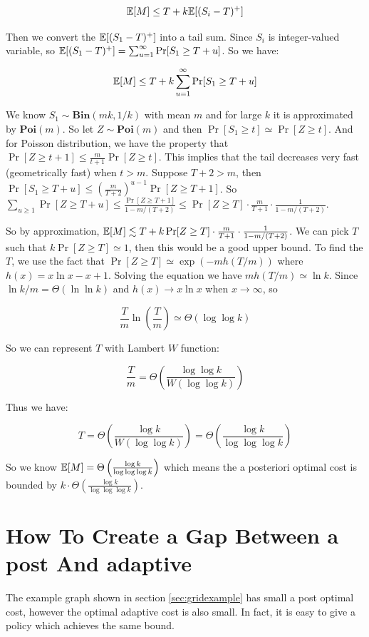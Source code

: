 \documentclass[12pt]{amsart}
\begin{document}
\begin{align*}
    \mathbb{E}[M] \le T + k \mathbb{E}[(S_i - T)^+]
\end{align*}

Then we convert the $\mathbb{E}[(S_1 - T)^+]$ into a tail sum. Since $S_i$ is integer-valued variable, so $\mathbb{E}[(S_1 - T)^+] = \sum_{u=1}^{\infty} \Pr[S_1 \ge T + u]$. So we have:

\begin{align*}
    \mathbb{E}[M] \le T + k \sum_{u=1}^{\infty} \Pr[S_1 \ge T + u]
\end{align*}

We know $S_1 \sim \textbf{Bin}(mk, 1/k)$ with mean $m$ and for large $k$ it is approximated by $\textbf{Poi}(m)$. So let $Z \sim \textbf{Poi}(m)$ and then $\Pr[S_1 \ge t] \simeq \Pr[Z \ge t]$. And for Poisson distribution, we have the property that $\Pr[Z \ge t + 1] \le \frac{m}{t + 1}\Pr[Z \ge t]$. This implies that the tail decreases very fast (geometrically fast) when $t > m$. Suppose $T + 2 > m$, then $\Pr[S_1 \ge T + u] \le (\frac{m}{T + 2})^{u-1} \Pr[Z \ge T + 1]$. So $\sum_{u \ge 1} \Pr[Z \ge T + u] \le \frac{\Pr[Z \ge T + 1]}{1 - m/(T + 2)} \le \Pr[Z \ge T] \cdot \frac{m}{T + 1} \cdot \frac{1}{1 - m / (T + 2)}$.

So by approximation, $\mathbb{E}[M] \lesssim T + k \Pr[Z \ge T] \cdot \frac{m}{T + 1} \cdot \frac{1}{1 - m / (T + 2)}$. We can pick $T$ such that $k \Pr[Z \ge T] \simeq 1$, then this would be a good upper bound. To find the $T$, we use the fact that $\Pr[Z \ge T] \simeq \exp(-m h(T/m))$ where $h(x) = x \ln x - x + 1$. Solving the equation we have $m h(T/m) \simeq \ln k$. Since $\ln k / m = \Theta(\ln \ln k)$ and $h(x) \rightarrow x \ln x$ when $x \rightarrow \infty$, so

$$
    \frac{T}{m} \ln (\frac{T}{m}) \simeq \Theta(\log \log k)
$$

So we can represent $T$ with Lambert $W$ function:

$$
\frac{T}{m} = \Theta\left(\frac{\log \log k}{W(\log \log k)}\right)
$$

Thus we have:

$$
T = \Theta\left(\frac{\log k}{W(\log \log k)}\right) = \Theta\left(\frac{\log k}{\log \log \log k}\right)
$$

So we know $\mathbb{E}[M] = \Theta\left(\frac{\log k}{\log \log \log k}\right)$ which means the a posteriori optimal cost is bounded by $k \cdot \Theta\left(\frac{\log k}{\log \log \log k}\right)$.

\section{How To Create a Gap Between a post And adaptive}
The example graph shown in section \ref{sec:gridexample} has small a post optimal cost, however the optimal adaptive cost is also small. In fact, it is easy to give a policy which achieves the same bound.
\end{document}
